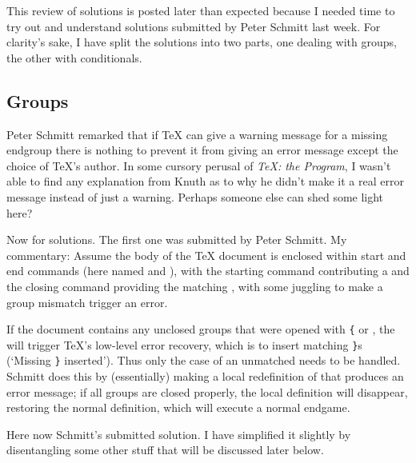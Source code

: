 
This review of solutions is posted later than expected because I
needed time to try out and understand solutions submitted by Peter
Schmitt last week.  For clarity's sake, I have split the solutions
into two parts, one dealing with groups, the other with conditionals.

\subsection{Groups}

Peter Schmitt 
remarked that if TeX can give a warning message for a
missing endgroup there is nothing to prevent it from giving an error
message except the choice of TeX's author. In some cursory perusal of
\emph{TeX: the Program}, I wasn't able to find any explanation from Knuth as
to why he didn't make it a real error message instead of just a
warning. Perhaps someone else can shed some light here?

Now for solutions. The first one was submitted by Peter Schmitt. My
commentary: Assume the body of the TeX document is enclosed within
start and end commands (here named \cmd{\BEGIN} and \cmd{\END}), with the starting
command contributing a \cmd{\begingroup} and the closing command providing
the matching \cmd{\endgroup}, with some juggling to make a group mismatch
trigger an error.

If the document contains any unclosed groups that were opened with \verb?{?
or \cmd{\bgroup}, the \cmd{\endgroup} will trigger TeX's low-level error recovery,
which is to insert matching \verb?}?s ({\ttfamily `Missing \verb?}? inserted'}). 
Thus only the
case of an unmatched \cmd{\begingroup} needs to be handled. Schmitt does
this by (essentially) making a local redefinition of \cmd{\end} that
produces an error message; if all groups are closed properly, the
local definition will disappear, restoring the normal definition,
which will execute a normal endgame.

Here now Schmitt's submitted solution. I have simplified it slightly
by disentangling some other stuff that will be discussed later below.

